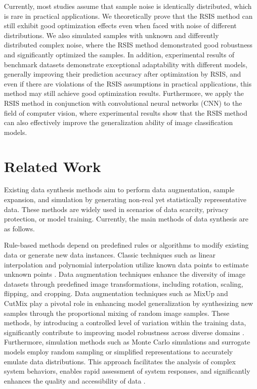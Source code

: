 \documentclass[lettersize,journal]{IEEEtran}
\begin{document}
Currently, most studies assume that sample noise is identically 
distributed, which is rare in practical applications. We theoretically 
prove that the RSIS method can still exhibit good optimization 
effects even when faced with noise of different distributions. We 
also simulated samples with unknown and differently distributed 
complex noise, where the RSIS method demonstrated good robustness 
and significantly optimized the samples. In addition, experimental 
results of benchmark datasets demonstrate exceptional adaptability 
with different models, generally improving their prediction accuracy 
after optimization by RSIS, and even if there are violations of the 
RSIS assumptions in practical applications, this method may still 
achieve good optimization results. Furthermore, we apply the RSIS 
method in conjunction with convolutional neural networks (CNN) to 
the field of computer vision, where experimental results show that 
the RSIS method can also effectively improve the generalization 
ability of image classification models. 




\section{Related Work}
Existing data synthesis methods aim to perform data augmentation, 
sample expansion, and simulation by generating non-real yet 
statistically representative data. These methods are widely used in 
scenarios of data scarcity, privacy protection, or model training. 
Currently, the main methods of data 
synthesis are as follows.

Rule-based methods depend on predefined rules or algorithms to modify 
existing data or generate new data instances. Classic techniques such 
as linear interpolation and polynomial interpolation utilize known 
data points to estimate unknown points \cite{bib19,bib20}. Data augmentation 
techniques enhance the diversity of image datasets through predefined 
image transformations, including rotation, scaling, flipping, and 
cropping. Data augmentation techniques such as MixUp and CutMix play 
a pivotal role in enhancing model generalization by synthesizing new 
samples through the proportional mixing of random image samples. These 
methods, by introducing a controlled level of variation within the 
training data, significantly contribute to improving model robustness 
across diverse domains \cite{bib21,bib22}. Furthermore, simulation methods 
such as Monte Carlo simulations and surrogate models employ random 
sampling or simplified representations to accurately emulate data 
distributions. This approach facilitates the analysis of complex 
system behaviors, enables rapid assessment of system responses, and 
significantly enhances the quality and accessibility of data \cite{bib23,bib25}.
\end{document}
